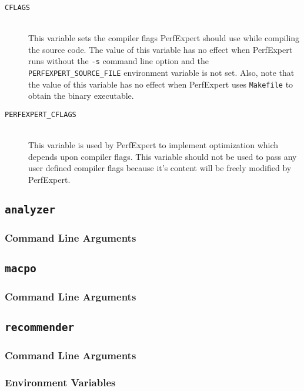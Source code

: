 \begin{description}
	\item[\texttt{CFLAGS}]\hfill \\
	This variable sets the compiler flags PerfExpert should use while compiling the source code. The value of this variable has no effect when PerfExpert runs without the \texttt{-s} command line option and the \texttt{PERFEXPERT\_SOURCE\_FILE} environment variable is not set. Also, note that the value of this variable has no effect when PerfExpert uses \texttt{Makefile} to obtain the binary executable.

	\item[\texttt{PERFEXPERT\_CFLAGS}]\hfill \\
	This variable is used by PerfExpert to implement optimization which depends upon compiler flags. This variable should not be used to pass any user defined compiler flags because it's content will be freely modified by PerfExpert.
\end{description}

\subsection{\texttt{analyzer}}

\subsubsection{Command Line Arguments}

\subsection{\texttt{macpo}}

\subsubsection{Command Line Arguments}

\subsection{\texttt{recommender}}

\subsubsection{Command Line Arguments}

\subsubsection{Environment Variables}

